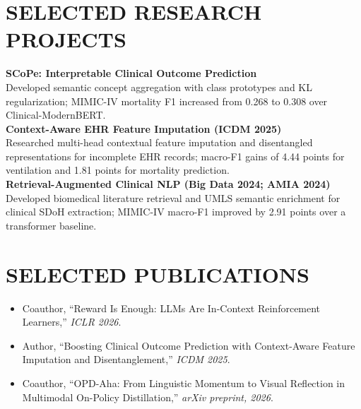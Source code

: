 \documentclass[10pt, letterpaper]{article}
\begin{document}
\section{SELECTED RESEARCH PROJECTS}
\textbf{SCoPe: Interpretable Clinical Outcome Prediction}\\[-1pt]
Developed semantic concept aggregation with class prototypes and KL regularization; MIMIC-IV mortality F1 increased from 0.268 to 0.308 over Clinical-ModernBERT.\\[3pt]
\textbf{Context-Aware EHR Feature Imputation (ICDM 2025)}\\[-1pt]
Researched multi-head contextual feature imputation and disentangled representations for incomplete EHR records; macro-F1 gains of 4.44 points for ventilation and 1.81 points for mortality prediction.\\[3pt]
\textbf{Retrieval-Augmented Clinical NLP (Big Data 2024; AMIA 2024)}\\[-1pt]
Developed biomedical literature retrieval and UMLS semantic enrichment for clinical SDoH extraction; MIMIC-IV macro-F1 improved by 2.91 points over a transformer baseline.\\[3pt]
\section{SELECTED PUBLICATIONS}
\begin{itemize}
\item Coauthor, ``Reward Is Enough: LLMs Are In-Context Reinforcement Learners,'' \textit{ICLR 2026}.
\item Author, ``Boosting Clinical Outcome Prediction with Context-Aware Feature Imputation and Disentanglement,'' \textit{ICDM 2025}.
\item Coauthor, ``OPD-Aha: From Linguistic Momentum to Visual Reflection in Multimodal On-Policy Distillation,'' \textit{arXiv preprint, 2026}.
\end{itemize}
\end{document}

